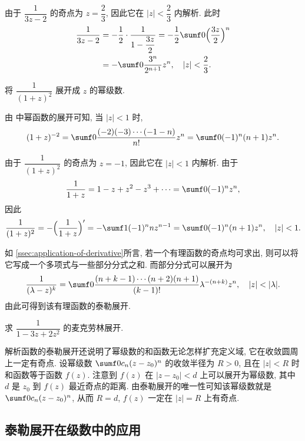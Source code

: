 \begin{solution}
  由于 $\dfrac1{3z-2}$ 的奇点为 $z=\dfrac23$, 因此它在 $|z|<\dfrac23$ 内解析.
  此时
  \begin{align*}
     \frac1{3z-2}&
    =-\half\cdot\frac1{1-\dfrac{3z}2}
    =-\half\sumf0 \Bigl(\frac{3z}2\Bigr)^n\\&
    =-\sumf0 \frac{3^n}{2^{n+1}}z^n,
      \quad|z|<\frac23.
  \end{align*}
\end{solution}

\begin{example}
  将 $\dfrac1{(1+z)^2}$ 展开成 $z$ 的幂级数.
\end{example}

\begin{solution}[解法一]
  由 中幂函数的展开可知, 当 $|z|<1$ 时,
  \[
    (1+z)^{-2}=\sumf0 \frac{(-2)(-3)\cdots(-1-n)}{n!}z^n
    =\sumf0 (-1)^n(n+1)z^n.
  \]
\end{solution}

\begin{solution}[解法二]
  由于 $\dfrac1{(1+z)^2}$ 的奇点为 $z=-1$, 因此它在 $|z|<1$ 内解析.
  由于
  \[
     \frac1{1+z}=1-z+z^2-z^3+\cdots
    =\sumf0 (-1)^nz^n,
  \]
  因此
  \[
     \frac1{(1+z)^2}
    =-\Bigl(\frac1{1+z}\Bigr)'
    =-\sumf1 (-1)^n nz^{n-1}
    =\sumf0 (-1)^n (n+1)z^n,\quad |z|<1.
  \]
\end{solution}

如 \ref{ssec:application-of-derivative}所言, 若一个有理函数的奇点均可求出, 则可以将它写成一个多项式与一些部分分式之和.
而部分分式可以展开为
\[
   \frac1{(\lambda-z)^k}
  =\sumf0 \frac{(n+k-1)\cdots(n+2)(n+1)}{(k-1)!}\lambda^{-(n+k)}z^n,\quad |z|<|\lambda|.
\]
由此可得到该有理函数的泰勒展开.

\begin{exercise}
  求 $\dfrac1{1-3z+2z^2}$ 的麦克劳林展开.
\end{exercise}
\smallskip

解析函数的泰勒展开还说明了幂级数的和函数无论怎样扩充定义域, 它在收敛圆周上一定有奇点.
设幂级数 $\sumf0c_n(z-z_0)^n$ 的收敛半径为 $R>0$, 且在 $|z|<R$ 时和函数等于函数 $f(z)$.
注意到 $f(z)$ 在 $|z-z_0|<d$ 上可以展开为幂级数, 其中 $d$ 是 $z_0$ 到 $f(z)$ 最近奇点的距离.
由泰勒展开的唯一性可知该幂级数就是 $\sumf0c_n(z-z_0)^n$, 从而 $R=d$, $f(z)$ 一定在 $|z|=R$ 上有奇点.


\subsection{泰勒展开在级数中的应用\optional}

